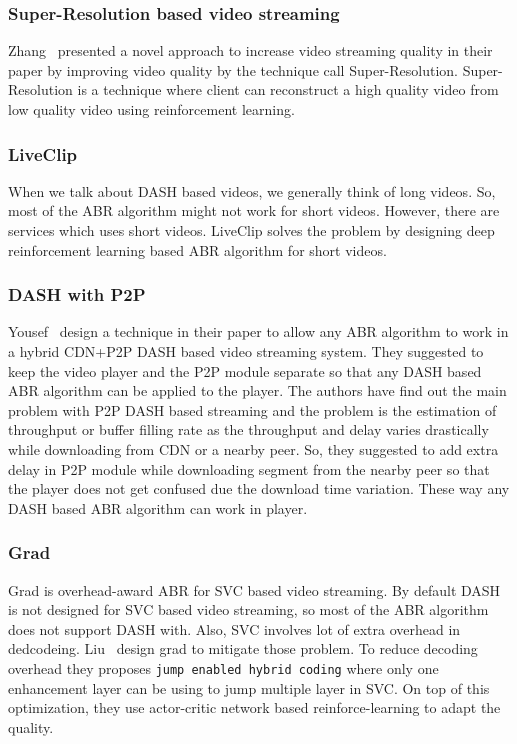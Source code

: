 \subsubsection{Super-Resolution based video streaming}
Zhang \etal\ presented a novel approach to increase video streaming quality in their paper \cite{9155384} by improving video quality by the technique call Super-Resolution. Super-Resolution is a technique where client can reconstruct a high quality video from low quality video using reinforcement learning.

\subsubsection{LiveClip}
When we talk about DASH based videos, we generally think of long videos. So, most of the ABR algorithm might not work for short videos. However, there are services which uses short videos. LiveClip\cite{10.1145/3386290.3396937} solves the problem by designing deep reinforcement learning based ABR algorithm for short videos.

\subsubsection{DASH with P2P}
Yousef \etal\ design a technique in their paper \cite{10.1145/3339825.3391859} to allow any ABR algorithm to work in a hybrid CDN+P2P DASH based video streaming system. They suggested to keep the video player and the P2P module separate so that any DASH based ABR algorithm can be applied to the player. The authors have find out the main problem with P2P DASH based streaming and the problem is the estimation of throughput or buffer filling rate as the throughput and delay varies drastically while downloading from CDN or a nearby peer. So, they suggested to add extra delay in P2P module while downloading segment from the nearby peer so that the player does not get confused due the download time variation. These way any DASH based ABR algorithm can work in player.

\subsubsection{Grad}
Grad\cite{10.1145/3394171.3413512} is overhead-award ABR for SVC based video streaming. By default DASH is not designed for SVC based video streaming, so most of the ABR algorithm does not support DASH with. Also, SVC involves lot of extra overhead in dedcodeing. Liu \etal\ design grad to mitigate those problem. To reduce decoding overhead they proposes {\tt jump enabled hybrid coding} where only one enhancement layer can be using to jump multiple layer in SVC. On top of this optimization, they use actor-critic network based reinforce-learning to adapt the quality.
